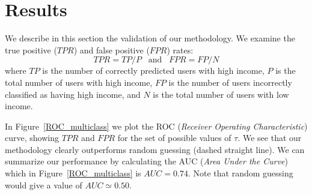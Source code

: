 \section{Results}





We describe in this section the validation of our methodology.
We examine the true positive ($TPR$) and false positive ($FPR$) rates:
\[
	TPR=TP/P \enspace \text{ and } \enspace FPR=FP/N
\]
where $TP$ is the number of correctly predicted users with high income, $P$ is the total number of users with high income, $FP$ is the number of users incorrectly classified as having high income, and $N$ is the total number of users with low income.

In Figure~\ref{ROC_multiclass} we plot the ROC (\textit{Receiver Operating Characteristic}) curve, showing $TPR$ and $FPR$ for the set of possible values of $\tau$. We see that our methodology clearly outperforms random guessing (dashed straight line). We can summarize our performance by calculating  the AUC (\textit{Area Under the Curve}) which in Figure~\ref{ROC_multiclass} is $AUC = 0.74$. Note that random guessing would give a value of $AUC \simeq 0.50$.


%

